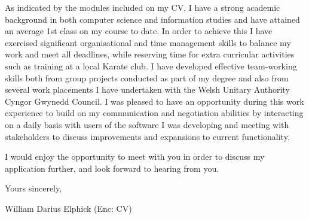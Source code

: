 \documentclass[11pt,letterpaper]{article}
\begin{document}
As indicated by the modules included on my CV, I have a strong academic background in both computer science and information studies and have attained an average 1st class on my course to date. In order to achieve this I have exercised significant organisational and time management skills to balance my work and meet all deadlines, while reserving time for extra curricular activities such as training at a local Karate club. I have developed effective team-working skills both from group projects conducted as part of my degree and also from several work placements I have undertaken with the Welsh Unitary Authority Cyngor Gwynedd Council. I was pleased to have an opportunity during this work experience to build on my communication and negotiation abilities by interacting on a daily basis with users of the software I was developing and meeting with stakeholders to discuss improvements and expansions to current functionality. 

I would enjoy the opportunity to meet with you in order to discuss my application further, and look forward to hearing from you.

Yours sincerely, 
\begin{figure}[h]
	\vspace{-10pt}
	\vspace{-20pt}
\end{figure}

William Darius Elphick\newline
(Enc: CV) 
\end{document}
